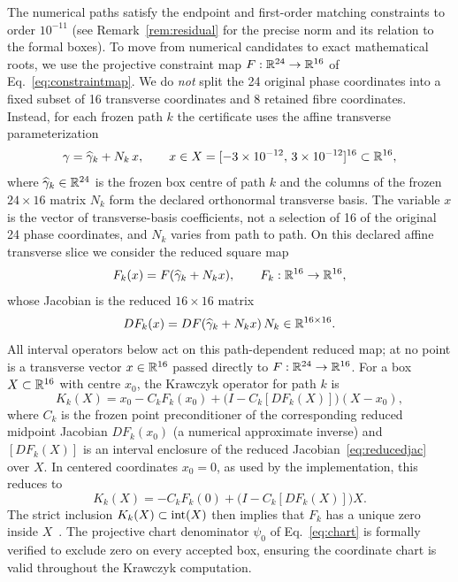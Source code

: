 The numerical paths satisfy the endpoint and first-order matching constraints to order
$10^{-11}$ (see Remark~\ref{rem:residual} for the precise norm and its relation to the
formal boxes). To move from numerical candidates to exact mathematical roots, we use the
projective constraint map $F:\mathbb{R}^{24}\to\mathbb{R}^{16}$ of Eq.~\eqref{eq:constraintmap}. We do
\emph{not} split the 24 original phase coordinates into a fixed subset of 16 transverse
coordinates and 8 retained fibre coordinates. Instead, for each frozen path $k$ the
certificate uses the affine transverse parameterization
\begin{equation}\label{eq:affine}
\gamma=\widehat{\gamma}_{k}+N_{k}\,x,
\qquad x\in X=[-3\times10^{-12},\,3\times10^{-12}]^{16}\subset\mathbb{R}^{16},
\end{equation}
where $\widehat{\gamma}_{k}\in\mathbb{R}^{24}$ is the frozen box centre of path $k$ and the
columns of the frozen $24\times16$ matrix $N_{k}$ form the declared orthonormal transverse
basis. The variable $x$ is the vector of transverse-basis coefficients, not a selection of
16 of the original 24 phase coordinates, and $N_{k}$ varies from path to path. On this
declared affine transverse slice we consider the reduced square map
\[
F_{k}(x)=F(\widehat{\gamma}_{k}+N_{k}x),\qquad F_{k}:\mathbb{R}^{16}\to\mathbb{R}^{16},
\]
whose Jacobian is the reduced $16\times16$ matrix
\begin{equation}\label{eq:reducedjac}
DF_{k}(x)=DF(\widehat{\gamma}_{k}+N_{k}x)\,N_{k}\in\mathbb{R}^{16\times16}.
\end{equation}
All interval operators below act on this path-dependent reduced map; at no point is a
transverse vector $x\in\mathbb{R}^{16}$ passed directly to $F:\mathbb{R}^{24}\to\mathbb{R}^{16}$. For a box
$X\subset\mathbb{R}^{16}$ with centre $x_{0}$, the Krawczyk operator for path $k$ is
\begin{equation}\label{eq:krawczyk}
K_{k}(X)=x_{0}-C_{k}F_{k}(x_{0})+\bigl(I-C_{k}[DF_{k}(X)]\bigr)(X-x_{0}),
\end{equation}
where $C_{k}$ is the frozen point preconditioner of the corresponding reduced midpoint
Jacobian $DF_{k}(x_{0})$ (a numerical approximate inverse) and $[DF_{k}(X)]$ is an
interval enclosure of the reduced Jacobian~\eqref{eq:reducedjac} over $X$. In centered
coordinates $x_{0}=0$, as used by the implementation, this reduces to
\[
K_{k}(X)=-C_{k}F_{k}(0)+\bigl(I-C_{k}[DF_{k}(X)]\bigr)X.
\]
The strict inclusion $K_{k}(X)\subset\operatorname{int}(X)$ then implies that $F_{k}$ has a unique
zero inside $X$~\cite{moore2009,tucker2011}. The projective chart denominator $\psi_{0}$ of
Eq.~\eqref{eq:chart} is formally verified to exclude zero on every accepted box, ensuring
the coordinate chart is valid throughout the Krawczyk computation.


